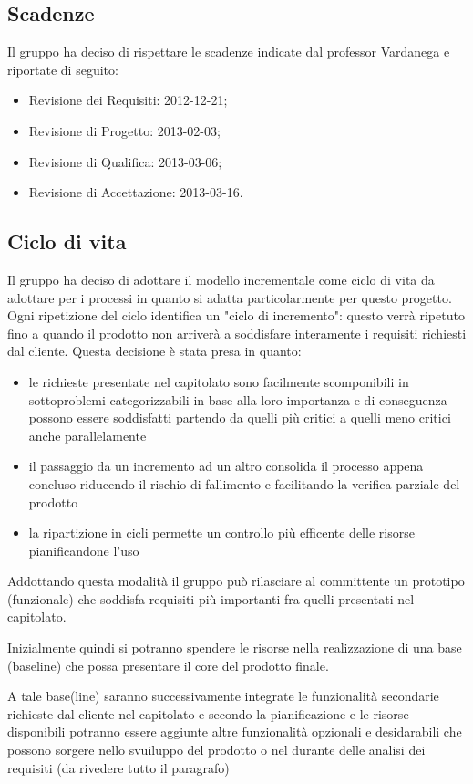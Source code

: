 	\subsection{Scadenze}
	Il gruppo ha deciso di rispettare le scadenze indicate dal professor Vardanega e riportate di seguito:
	\begin{itemize}
		\item Revisione dei Requisiti: 2012-12-21;
		\item Revisione di Progetto: 2013-02-03;
		\item Revisione di Qualifica: 2013-03-06;
		\item Revisione di Accettazione: 2013-03-16.
	\end{itemize}
	
	\subsection{Ciclo di vita}
	Il gruppo ha deciso di adottare il modello incrementale come ciclo di vita da adottare per i processi in quanto si adatta particolarmente per questo progetto.
	Ogni ripetizione del ciclo identifica un "ciclo di incremento": questo verrà ripetuto fino a quando il prodotto non arriverà a soddisfare interamente i requisiti richiesti dal cliente.
	Questa decisione è stata presa in quanto:
	\begin{itemize}
		\item le richieste presentate nel capitolato sono facilmente scomponibili in sottoproblemi categorizzabili in base alla loro importanza e di conseguenza possono essere soddisfatti partendo da quelli più critici a quelli meno critici anche parallelamente
		\item il passaggio da un incremento ad un altro consolida il processo appena concluso riducendo il rischio di fallimento e facilitando la verifica parziale del prodotto
		\item la ripartizione in cicli permette un controllo più efficente delle risorse pianificandone l'uso
	\end{itemize}
	Addottando questa modalità il gruppo può rilasciare al committente un prototipo (funzionale) che soddisfa requisiti più importanti fra quelli presentati nel capitolato.
	
	Inizialmente quindi si potranno spendere le risorse nella realizzazione di una base (baseline) che possa presentare il core del prodotto finale.
	
	A tale base(line) saranno successivamente integrate le funzionalità secondarie richieste dal cliente nel capitolato e secondo la pianificazione e le risorse disponibili potranno essere aggiunte altre funzionalità opzionali e desidarabili che possono sorgere nello svuiluppo del prodotto o nel durante delle analisi dei requisiti (da rivedere tutto il paragrafo)
	